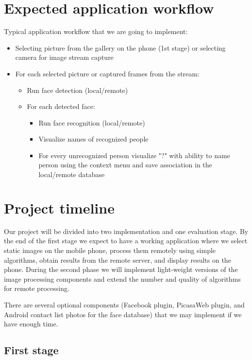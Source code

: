 \documentclass[conference]{IEEEtran}
\begin{document}
\section{Expected application workflow}

Typical application workflow that we are going to implement:

\begin{itemize}
	\item Selecting picture from the gallery on the phone (1st stage) or selecting camera for image stream capture
	\item For each selected picture or captured frames from the stream:
	\begin{itemize}
		\item Run face detection (local/remote)
		\item For each detected face:
		\begin{itemize}
			\item Run face recognition (local/remote)
			\item Visualize names of recognized people
			\item For every unrecognized person visualize "?" with ability to name person using the context menu and save association in the local/remote database
		\end{itemize}
	\end{itemize}
\end{itemize}

\section{Project timeline}

Our project will be divided into two implementation and one evaluation stage. By the end of the first stage we expect to have a working application where we select static images on the mobile phone, process them remotely using simple algorithms, obtain results from the remote server, and display results on the phone. During the second phase we will implement light-weight versions of the image processing components and extend the number and quality of algorithms for remote processing.

There are several optional components (Facebook plugin, PicasaWeb plugin, and Android contact list photos for the face database) that we may implement if we have enough time.

\subsection{First stage}
\end{document}
